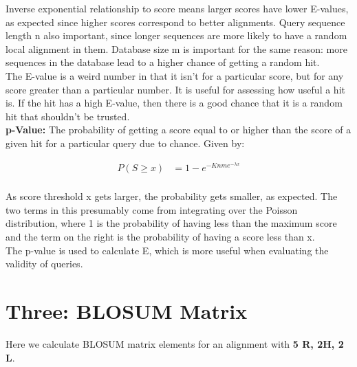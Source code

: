 \documentclass[10pt]{article} %
\begin{document}
Inverse exponential relationship to score means larger scores have lower E-values,
as expected since higher scores correspond to better alignments. Query sequence length
n also important, since longer sequences are more likely to have a random local
alignment in them. Database size m is important for the same reason: more sequences
in the database lead to a higher chance of getting a random hit.\\

The E-value is a weird number in that it isn't for a particular score, but for any
score greater than a particular number. It is useful for assessing how useful a hit
is. If the hit has a high E-value, then there is a good chance that it is a random
hit that shouldn't be trusted.\\

\textbf{p-Value:} The probability of getting a score equal to or higher than the score
of a given hit for a particular query due to chance. Given by:

\begin{align*}
  P(S\geq x) &= 1 - e^{-Knme^{-\lambda x}}\\
\end{align*}

As score threshold x gets larger, the probability gets smaller, as expected. The two
terms in this presumably come from integrating over the Poisson distribution, where
1 is the probability of having less than the maximum score and the term on the right
is the probability of having a score less than x.\\
The p-value is used to calculate E, which is more useful when evaluating the validity
of queries.\\

\section{Three: BLOSUM Matrix}
Here we calculate BLOSUM matrix elements for an alignment with
\textbf{5 R, 2H, 2 L}.\\
\end{document}
